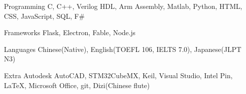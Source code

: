 
\begin{cvskills}
  \cvskill
    {Programming} %
    {C, C++, Verilog HDL, Arm Assembly, Matlab, Python, HTML, CSS, JavaScript, SQL, F\#} %

  \cvskill
    {Frameworks} %
    {Flask, Electron, Fable, Node.js} %
    
  \cvskill
    {Languages}
    {Chinese(Native), English(TOEFL 106, IELTS 7.0), Japanese(JLPT N3)}
    
  \cvskill
    {Extra} %
    {Autodesk AutoCAD, STM32CubeMX, Keil, Visual Studio, Intel Pin, LaTeX, Microsoft Office, git, Dizi(Chinese flute)} %
\end{cvskills}
